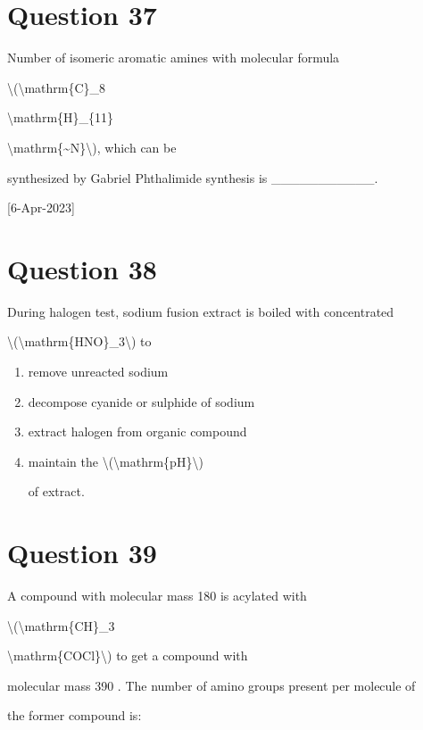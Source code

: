 \documentclass{article}
\begin{document}
\section*{Question 37}
Number of isomeric aromatic amines with molecular formula

\textbackslash(\textbackslash mathrm\{C\}\_8

\textbackslash mathrm\{H\}\_\{11\}

\textbackslash mathrm\{\textasciitilde N\}\textbackslash), which can be

synthesized by Gabriel Phthalimide synthesis is \_\_\_\_\_\_\_\_\_\_\_.~

{[}6-Apr-2023{]}


\begin{enumerate}[label=(\alph*)]
\end{enumerate}
\newpage
\section*{Question 38}
During halogen test, sodium fusion extract is boiled with concentrated

\textbackslash(\textbackslash mathrm\{HNO\}\_3\textbackslash) to


\begin{enumerate}[label=(\alph*)]
\item remove unreacted sodium


\item decompose cyanide or sulphide of sodium


\item extract halogen from organic compound


\item maintain the \textbackslash(\textbackslash mathrm\{pH\}\textbackslash)

of extract.


\end{enumerate}
\newpage
\section*{Question 39}
A compound with molecular mass 180 is acylated with

\textbackslash(\textbackslash mathrm\{CH\}\_3

\textbackslash mathrm\{COCl\}\textbackslash) to get a compound with

molecular mass 390 . The number of amino groups present per molecule of

the former compound is:
\end{document}
